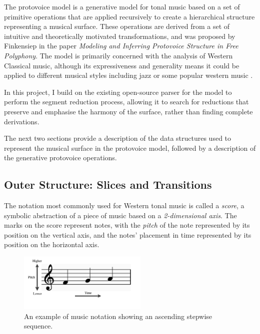 \documentclass[12pt,a4paper,twoside,openany]{report} \usepackage[pdfborder={0 0 0}]{hyperref}    %
\theoremstyle{definition} \newtheorem{definition}{Definition}[section]
\begin{document}
The protovoice model is a generative model for tonal music based on a set of primitive operations that are applied
recursively to create a hierarchical structure representing a musical surface. 
These operations are derived from a set of intuitive and theoretically motivated transformations, and was proposed by Finkensiep in the paper 
\textit{Modeling and Inferring Protovoice Structure in Free Polyphony}\cite{finkensiepModelingInferringProtovoice2021}.
The model is primarily concerned with the analysis of Western Classical music, although its expressiveness and generality means it could be applied to different musical styles including jazz or some popular western music \cite{finkensiepStructureFreePolyphony2023}. 

In this project, I build on the existing open-source parser for the model \cite{finkensiepProtovoicesModelTonal2021} to perform the segment reduction process, allowing it to search for reductions that preserve and emphasise the harmony of the surface, rather than finding complete derivations. 

The next two sections provide a description of the data structures used to represent the musical surface in the protovoice model, followed by a description of the generative protovoice operations. 

\subsection{Outer Structure: Slices and Transitions} 
\label{sub:slicesTransitions}

The notation most commonly used for Western tonal music is called a \textit{score}, a symbolic abstraction of a piece of music based on a \textit{2-dimensional axis}.
The marks on the score represent notes, with the \textit{pitch} of the note represented by its position on the vertical axis, and the notes' placement in time represented by its position on the horizontal axis. 

\begin{figure}[ht] 
\centering \includegraphics[width=0.55\textwidth]{prep/pitchTime.png}
\captionsetup{width=.7\linewidth} \caption{An example of music notation showing an ascending stepwise sequence.}
\label{fig:pitchTime} 
\end{figure} 
\end{document}
